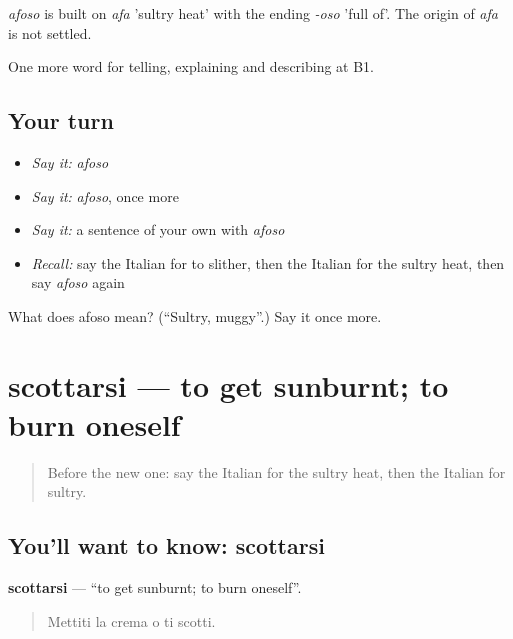 \begin{cousinweb}
\emph{afoso} is built on \emph{afa} 'sultry heat' with the ending \emph{-oso} 'full of'. The origin of \emph{afa} is not settled.
\end{cousinweb}

\begin{grammarlens}[title={What you've built}]
One more word for telling, explaining and describing at B1.
\end{grammarlens}

\subsection*{Your turn}
\begin{itemize}
\raggedright
  \item \emph{Say it:} \emph{afoso}
  \item \emph{Say it:} \emph{afoso}, once more
  \item \emph{Say it:} a sentence of your own with \emph{afoso}
  \item \emph{Recall:} say the Italian for to slither, then the Italian for the sultry heat, then say \emph{afoso} again
\end{itemize}

\begin{tcolorbox}[breakable,colback=teal!4,colframe=teal!35!black,title={Before you move on}]
What does afoso mean? (\textquotedblleft{}Sultry, muggy\textquotedblright{}.) Say it once more.
\end{tcolorbox}
\section[scottarsi]{scottarsi — to get sunburnt; to burn oneself}

\label{lesson:IT-C466-scottarsi}



\begin{quote}
Before the new one: say the Italian for the sultry heat, then the Italian for sultry.
\end{quote}

\subsection*{You'll want to know: scottarsi}
\textbf{scottarsi} — \textquotedblleft{}to get sunburnt; to burn oneself\textquotedblright{}.

\begin{quote}
Mettiti la crema o ti scotti.
\end{quote}

